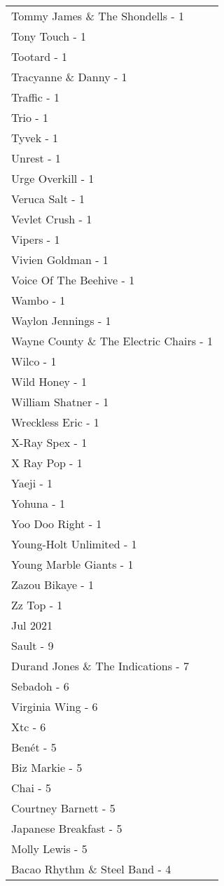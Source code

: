 \documentclass[
]{article}
\begin{document}
\begin{longtable}{l}
Tommy James \& The Shondells - 1 \\ 
Tony Touch - 1 \\ 
Tootard - 1 \\ 
Tracyanne \& Danny - 1 \\ 
Traffic - 1 \\ 
Trio - 1 \\ 
Tyvek - 1 \\ 
Unrest - 1 \\ 
Urge Overkill - 1 \\ 
Veruca Salt - 1 \\ 
Vevlet Crush - 1 \\ 
Vipers - 1 \\ 
Vivien Goldman - 1 \\ 
Voice Of The Beehive - 1 \\ 
Wambo - 1 \\ 
Waylon Jennings - 1 \\ 
Wayne County \& The Electric Chairs - 1 \\ 
Wilco - 1 \\ 
Wild Honey - 1 \\ 
William Shatner - 1 \\ 
Wreckless Eric - 1 \\ 
X-Ray Spex - 1 \\ 
X Ray Pop - 1 \\ 
Yaeji - 1 \\ 
Yohuna - 1 \\ 
Yoo Doo Right - 1 \\ 
Young-Holt Unlimited - 1 \\ 
Young Marble Giants - 1 \\ 
Zazou Bikaye - 1 \\ 
Zz Top - 1 \\ 
\midrule
\multicolumn{1}{l}{Jul 2021} \\ 
\midrule
Sault - 9 \\ 
Durand Jones \& The Indications - 7 \\ 
Sebadoh - 6 \\ 
Virginia Wing - 6 \\ 
Xtc - 6 \\ 
Benét - 5 \\ 
Biz Markie - 5 \\ 
Chai - 5 \\ 
Courtney Barnett - 5 \\ 
Japanese Breakfast - 5 \\ 
Molly Lewis - 5 \\ 
Bacao Rhythm \& Steel Band - 4 \\ 

\end{longtable}
\end{document}
